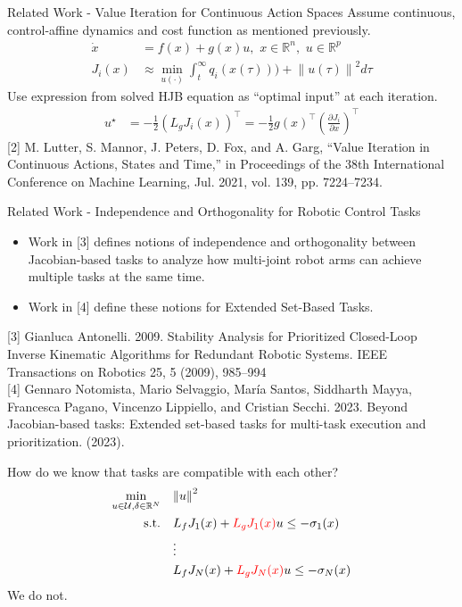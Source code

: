 \begin{frame}{Related Work - Value Iteration for Continuous Action Spaces}
	Assume continuous, control-affine dynamics and cost function as mentioned previously.
	\begin{align*}
		\dot{x} &= f(x) + g(x)u, \,\, x \in \mathbb{R}^n, \,\, u \in \mathbb{R}^p \\
		J_i (x) &\approx \min_{u(\cdot)} \int_t^{\infty} q_i(x(\tau))) + {\lVert u(\tau) \rVert}^2 d \tau
	\end{align*}
	Use expression from solved HJB equation as ``optimal input'' at each iteration.
	\begin{align*}
		u^{\star} &= - \frac{1}{2} ( L_g {J}_i (x) )^{\top} = - \frac{1}{2} g(x)^{\top} \left( \frac{\partial {J}_i}{\partial x} \right)^{\top}
	\end{align*}
	\seprule
	\footnotesize{[2] M. Lutter, S. Mannor, J. Peters, D. Fox, and A. Garg, “Value Iteration in Continuous Actions, States and Time,” in Proceedings of the 38th International Conference on Machine Learning, Jul. 2021, vol. 139, pp. 7224–7234.}
\end{frame}

\begin{frame}{Related Work - Independence and Orthogonality for Robotic Control Tasks}
	\begin{itemize}
		\item{Work in [3] defines notions of independence and orthogonality between Jacobian-based tasks to analyze how multi-joint robot arms can achieve multiple tasks at the same time.}
		\item{Work in [4] define these notions for Extended Set-Based Tasks.}
	\end{itemize}

	\seprule
	\footnotesize{[3] Gianluca Antonelli. 2009. Stability Analysis for Prioritized Closed-Loop Inverse Kinematic Algorithms for Redundant Robotic Systems. IEEE Transactions on Robotics 25, 5 (2009), 985–994}\\
	\footnotesize{[4] Gennaro Notomista, Mario Selvaggio, María Santos, Siddharth Mayya, Francesca Pagano, Vincenzo Lippiello, and Cristian Secchi. 2023. Beyond Jacobian-based tasks: Extended set-based tasks for multi-task execution and prioritization. (2023).}

\end{frame}

\begin{frame}{How do we know that tasks are compatible with each other?}
	\begin{align*}
		\min_{u \in \mathcal{U}, \delta \in \mathbb{R}^N} \quad & { \lVert u \rVert }^2 \\
		\textrm{s.t.} \quad & L_f {J}_1 (x) + { \color{red} L_g {J}_1 (x) } u \le - \sigma_1(x) \\
                \quad & \vdots \\
		\quad & L_f {J}_N (x) + { \color{red} L_g {J}_N (x) } u \le - \sigma_N(x) \\
	\end{align*}
	\centering
	We do not.
\end{frame}

